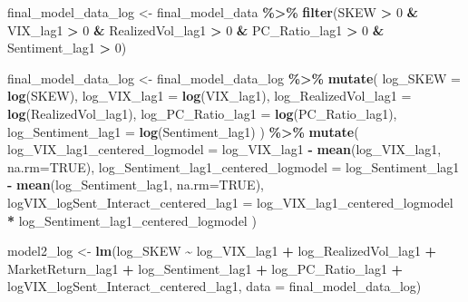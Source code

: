 \documentclass[
]{article}
\newenvironment{Shaded}{\begin{snugshade}}{\end{snugshade}}
\newcommand{\AttributeTok}[1]{\textcolor[rgb]{0.13,0.29,0.53}{#1}}
\newcommand{\ConstantTok}[1]{\textcolor[rgb]{0.56,0.35,0.01}{#1}}
\newcommand{\DecValTok}[1]{\textcolor[rgb]{0.00,0.00,0.81}{#1}}
\newcommand{\FunctionTok}[1]{\textcolor[rgb]{0.13,0.29,0.53}{\textbf{#1}}}
\newcommand{\NormalTok}[1]{#1}
\newcommand{\OtherTok}[1]{\textcolor[rgb]{0.56,0.35,0.01}{#1}}
\newcommand{\SpecialCharTok}[1]{\textcolor[rgb]{0.81,0.36,0.00}{\textbf{#1}}}
\begin{document}
\begin{Shaded}
\begin{Highlighting}[]
\NormalTok{  final\_model\_data\_log }\OtherTok{\textless{}{-}}\NormalTok{ final\_model\_data }\SpecialCharTok{\%\textgreater{}\%}
  \FunctionTok{filter}\NormalTok{(SKEW }\SpecialCharTok{\textgreater{}} \DecValTok{0} \SpecialCharTok{\&}\NormalTok{ VIX\_lag1 }\SpecialCharTok{\textgreater{}} \DecValTok{0} \SpecialCharTok{\&}\NormalTok{ RealizedVol\_lag1 }\SpecialCharTok{\textgreater{}} \DecValTok{0} \SpecialCharTok{\&}\NormalTok{ PC\_Ratio\_lag1 }\SpecialCharTok{\textgreater{}} \DecValTok{0} \SpecialCharTok{\&}\NormalTok{ Sentiment\_lag1 }\SpecialCharTok{\textgreater{}} \DecValTok{0}\NormalTok{) }
  
\NormalTok{  final\_model\_data\_log }\OtherTok{\textless{}{-}}\NormalTok{ final\_model\_data\_log }\SpecialCharTok{\%\textgreater{}\%}
    \FunctionTok{mutate}\NormalTok{(}
      \AttributeTok{log\_SKEW =} \FunctionTok{log}\NormalTok{(SKEW),}
      \AttributeTok{log\_VIX\_lag1 =} \FunctionTok{log}\NormalTok{(VIX\_lag1),}
      \AttributeTok{log\_RealizedVol\_lag1 =} \FunctionTok{log}\NormalTok{(RealizedVol\_lag1),}
      \AttributeTok{log\_PC\_Ratio\_lag1 =} \FunctionTok{log}\NormalTok{(PC\_Ratio\_lag1),}
      \AttributeTok{log\_Sentiment\_lag1 =} \FunctionTok{log}\NormalTok{(Sentiment\_lag1) }
\NormalTok{    ) }\SpecialCharTok{\%\textgreater{}\%}
    \FunctionTok{mutate}\NormalTok{(}
      \AttributeTok{log\_VIX\_lag1\_centered\_logmodel =}\NormalTok{ log\_VIX\_lag1 }\SpecialCharTok{{-}} \FunctionTok{mean}\NormalTok{(log\_VIX\_lag1, }\AttributeTok{na.rm=}\ConstantTok{TRUE}\NormalTok{),}
      \AttributeTok{log\_Sentiment\_lag1\_centered\_logmodel =}\NormalTok{ log\_Sentiment\_lag1 }\SpecialCharTok{{-}} \FunctionTok{mean}\NormalTok{(log\_Sentiment\_lag1, }\AttributeTok{na.rm=}\ConstantTok{TRUE}\NormalTok{),}
      \AttributeTok{logVIX\_logSent\_Interact\_centered\_lag1 =}\NormalTok{ log\_VIX\_lag1\_centered\_logmodel }\SpecialCharTok{*}\NormalTok{ log\_Sentiment\_lag1\_centered\_logmodel}
\NormalTok{    )}
  
\NormalTok{    model2\_log }\OtherTok{\textless{}{-}} \FunctionTok{lm}\NormalTok{(log\_SKEW }\SpecialCharTok{\textasciitilde{}}\NormalTok{ log\_VIX\_lag1 }\SpecialCharTok{+}\NormalTok{ log\_RealizedVol\_lag1 }\SpecialCharTok{+} 
\NormalTok{                           MarketReturn\_lag1 }\SpecialCharTok{+}\NormalTok{ log\_Sentiment\_lag1 }\SpecialCharTok{+}\NormalTok{ log\_PC\_Ratio\_lag1 }\SpecialCharTok{+}
\NormalTok{                           logVIX\_logSent\_Interact\_centered\_lag1, }
                         \AttributeTok{data =}\NormalTok{ final\_model\_data\_log)}
    

\end{Highlighting}
\end{Shaded}
\end{document}

